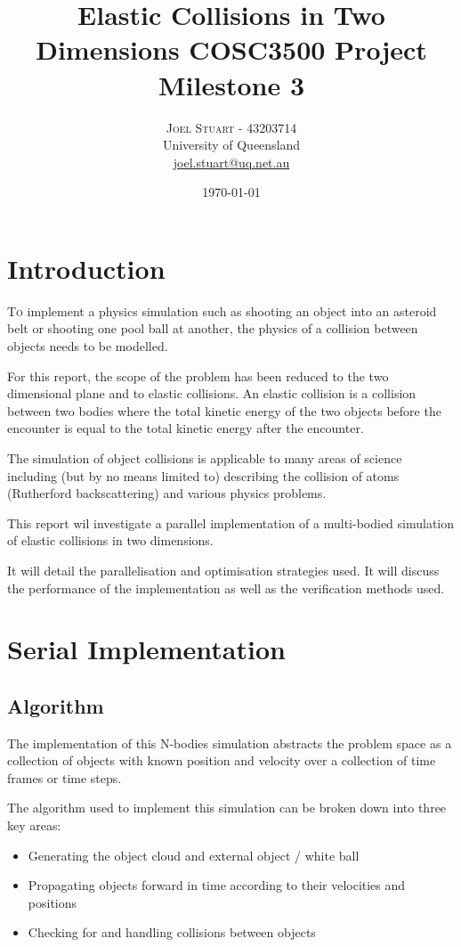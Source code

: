 \documentclass[twoside,twocolumn]{article}
\title{Elastic Collisions in Two Dimensions COSC3500 Project Milestone 3} %
\author{%
	\textsc{Joel Stuart - 43203714} \\[1ex] %
	\normalsize University of Queensland \\ %
	\normalsize \href{mailto:joel.stuart@uq.net.au}{joel.stuart@uq.net.au} %
}
\date{\today} %
\begin{document}
	
	\maketitle

	
	\section{Introduction}
	
	\lettrine[nindent=0em,lines=3]{T}o implement a physics simulation such as shooting an object into an asteroid belt or shooting one pool ball at another, the physics of a collision between objects needs to be modelled. \newline
	
	For this report, the scope of the problem has been reduced to the two dimensional plane and to elastic collisions. An elastic collision is a collision between two bodies where the total kinetic energy of the two objects before the encounter is equal to the total kinetic energy after the encounter. \newline 
	
	The simulation of object collisions is applicable to many areas of science including (but by no means limited to) describing the collision of atoms (Rutherford backscattering) and various physics problems.\newline 
	
	This report wil investigate a parallel implementation of a multi-bodied simulation of elastic collisions in two dimensions.\newline
	
	 It will detail the parallelisation and optimisation strategies used. It will discuss the performance of the implementation as well as the verification methods used.
	
	\section{Serial Implementation}
	\subsection{Algorithm}
	
	The implementation of this N-bodies simulation abstracts the problem space as a collection of objects with known position and velocity over a collection of time frames or time steps.
	
	The algorithm used to implement this simulation can be broken down into three key areas:
	\begin{itemize}
		\item Generating the object cloud and external object / white ball 
		\item Propagating objects forward in time according to their velocities and positions
		\item Checking for and handling collisions between objects
	\end{itemize}
	
\end{document}
